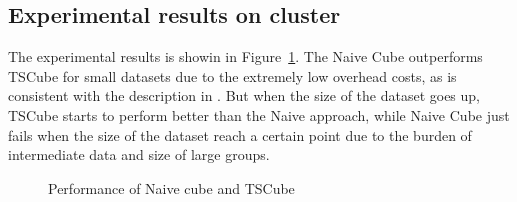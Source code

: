 \documentclass{article}
\begin{document}
\subsection{Experimental results on cluster}

The experimental results is showin in Figure~\ref{fig:performance}. The Naive Cube outperforms TSCube for small datasets due to the extremely low overhead costs, as is consistent with the description in \cite{nandi2012data}. But when the size of the dataset goes up, TSCube starts to perform better than the Naive approach, while Naive Cube just fails when the size of the dataset reach a certain point due to the burden of intermediate data and size of large groups.

\begin{figure}[h]
\centering
{}

\caption{Performance of Naive cube and TSCube}
\label{fig:performance}
\end{figure}


\end{document}
